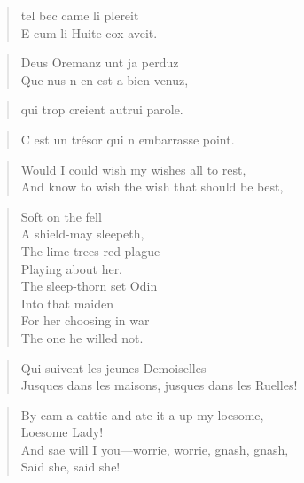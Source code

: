\begin{verse}
\textquotesingle{} tel bec came li plereit \\
E cum li Huite cox aveit.\textquotesingle{} 
\end{verse}

\begin{verse}
\textquotesingle{} Deus Oremanz unt ja perduz \\
Que nus n\textquotesingle{} en est a bien venuz,\textquotesingle{} 
\end{verse}

\begin{verse}
\textquotesingle{} qui trop creient autrui parole.\textquotesingle{} 
\end{verse}

\begin{verse}
\textquotesingle{} C\textquotesingle{} est un trésor qui n\textquotesingle{} embarrasse point.\textquotesingle{} 
\end{verse}

\begin{verse}
\textquotesingle{} Would I could wish my wishes all to rest, \\
And know to wish the wish that should be best,
\end{verse}

\begin{verse}
\textquotesingle{} Soft on the fell \\
A shield-may sleepeth, \\
The lime-trees\textquotesingle{}  red plague \\
Playing about her. \\
The sleep-thorn set Odin \\
Into that maiden \\
For her choosing in war \\
The one he willed not.\textquotesingle{} 
\end{verse}

\begin{verse}
\vin \textquotesingle{} Qui suivent les jeunes Demoiselles \\
Jusques dans les maisons, jusques dans les Ruelles!\textquotesingle{} 
\end{verse}

\begin{verse}
\textquotesingle{} By cam\textquotesingle{}  a cattie and ate it a\textquotesingle{}  up my loesome, \\
\vin Loesome Lady! \\
And sae will I you—worrie, worrie, gnash, gnash, \\
\vin Said she, said she!\textquotesingle{} 
\end{verse}

